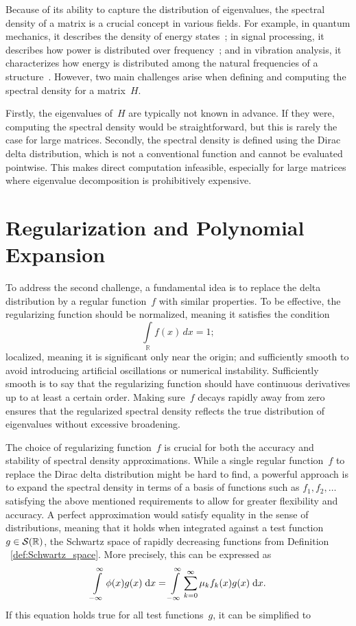 Because of its ability to capture the distribution of eigenvalues, the spectral density of a matrix is a crucial concept in various fields. For example, in quantum mechanics, it describes the density of energy states~\cite{reichl,sakurainapolitano}; in signal processing, it describes how power is distributed over frequency~\cite{oppenheimschafer, mitra}; and in vibration analysis, it characterizes how energy is distributed among the natural frequencies of a structure~\cite{nortonkarczub}. However, two main challenges arise when defining and computing the spectral density for a matrix~$H$.

Firstly, the eigenvalues of~$H$ are typically not known in advance. If they were, computing the spectral density would be straightforward, but this is rarely the case for large matrices. Secondly, the spectral density is defined using the Dirac delta distribution, which is not a conventional function and cannot be evaluated pointwise. This makes direct computation infeasible, especially for large matrices where eigenvalue decomposition is prohibitively expensive.

\section{Regularization and Polynomial Expansion}
To address the second challenge, a fundamental idea is to replace the delta distribution by a regular function~$f$ with similar properties. To be effective, the regularizing function should be normalized, meaning it satisfies the condition
\[
    \int\limits_{\mathbb{R}} f(x)\, dx = 1;
\]
localized, meaning it is significant only near the origin; and sufficiently smooth to avoid introducing artificial oscillations or numerical instability. Sufficiently smooth is to say that the regularizing function should have continuous derivatives up to at least a certain order. Making sure~$f$ decays rapidly away from zero ensures that the regularized spectral density reflects the true distribution of eigenvalues without excessive broadening.

The choice of regularizing function~$f$ is crucial for both the accuracy and stability of spectral density approximations. While a single regular function~$f$ to replace the Dirac delta distribution might be hard to find, a powerful approach is to expand the spectral density in terms of a basis of functions such as $f_1, f_2, \ldots$ satisfying the above mentioned requirements to allow for greater flexibility and accuracy. A perfect approximation would satisfy equality in the sense of distributions, meaning that it holds when integrated against a test function~$g \in \mathcal{S}(\mathbb{R})$, the Schwartz space of rapidly decreasing functions from Definition ~\ref{def:Schwartz_space}. More precisely, this can be expressed as
\[
\int\limits_{-\infty}^{\infty} \phi(x) g(x) \;\mathrm{d}x = \int\limits_{-\infty}^{\infty} \sum_{k=0}^{\infty} \mu_k f_k(x) g(x) \;\mathrm{d}x.
\]
If this equation holds true for all test functions~$g$, it can be simplified to

